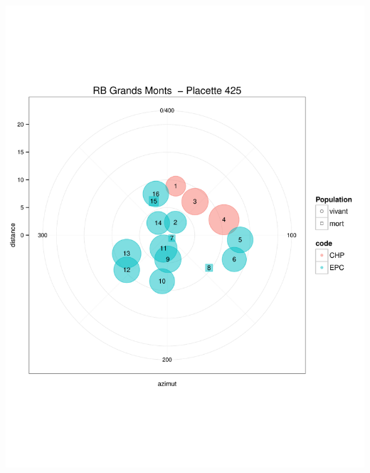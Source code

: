\documentclass[a4paper]{book}\usepackage[]{graphicx}\usepackage[]{color}
\makeatletter
\def\maxwidth{ %
  \ifdim\Gin@nat@width>\linewidth
    \linewidth
  \else
    \Gin@nat@width
  \fi
}
\newenvironment{knitrout}{}{} %
\makeatother
\begin{document}
\begin{knitrout}
{\centering \includegraphics[width=\maxwidth]{Figures/PlanArbres-39} 

}





\end{knitrout}
\end{document}
